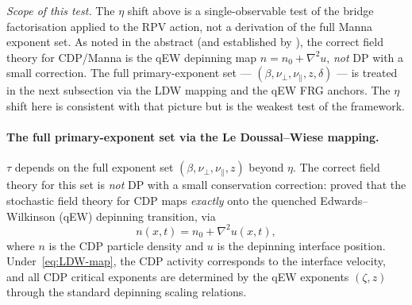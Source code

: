 \documentclass[10pt,a4paper,twocolumn]{article}
\theoremstyle{plain}
\theoremstyle{definition}
\begin{document}
\emph{Scope of this test.}  The $\eta$ shift above is a
single-observable test of the bridge factorisation applied to the
RPV action, not a derivation of the full Manna exponent set.  As
noted in the abstract (and established by
\citet{LeDoussalWiese2015}), the correct field theory for CDP/Manna
is the qEW depinning map $n = n_0 + \nabla^2 u$, \emph{not} DP
with a small correction.  The full primary-exponent set ---
$(\beta, \nu_\perp, \nu_\parallel, z, \delta)$ --- is treated in
the next subsection via the LDW mapping and the qEW FRG anchors.
The $\eta$ shift here is consistent with that picture but is the
weakest test of the framework.

\paragraph{The full primary-exponent set via the Le Doussal--Wiese
mapping.}
$\tau$ depends on the full exponent set $(\beta, \nu_\perp,
\nu_\parallel, z)$ beyond $\eta$.  The correct field theory for
this set is \emph{not} DP with a small conservation correction:
\citet{LeDoussalWiese2015} proved that the stochastic field theory
for CDP maps \emph{exactly} onto the quenched Edwards--Wilkinson
(qEW) depinning transition, via
\begin{equation}
  n(x, t) = n_0 + \nabla^2 u(x, t),
  \label{eq:LDW-map}
\end{equation}
where $n$ is the CDP particle density and $u$ is the depinning
interface position.  Under~\eqref{eq:LDW-map}, the CDP activity
corresponds to the interface velocity, and all CDP critical
exponents are determined by the qEW exponents $(\zeta, z)$
through the standard depinning scaling relations.
\end{document}
